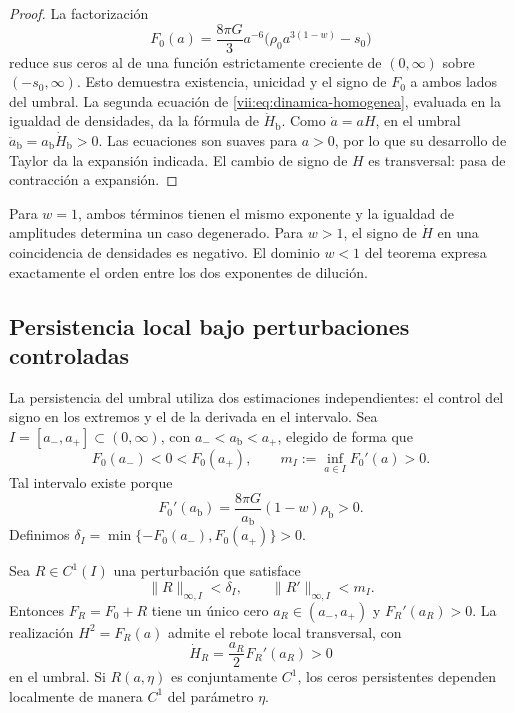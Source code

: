 \begin{proof}
La factorización
\[
 F_0(a)=\frac{8\pi G}{3}a^{-6}
             \bigl(\rho_0a^{3(1-w)}-s_0\bigr)
\]
reduce sus ceros al de una función estrictamente creciente de
\((0,\infty)\) sobre \((-s_0,\infty)\). Esto demuestra existencia,
unicidad y el signo de \(F_0\) a ambos lados del umbral.
La segunda ecuación de \eqref{vii:eq:dinamica-homogenea}, evaluada
en la igualdad de densidades, da la fórmula de \(\dot H_{\mathrm b}\).
Como \(\dot a=aH\), en el umbral
\(\ddot a_{\mathrm b}=a_{\mathrm b}\dot H_{\mathrm b}>0\).
Las ecuaciones son suaves para \(a>0\), por lo que su desarrollo de
Taylor da la expansión indicada. El cambio de signo de \(H\) es
transversal: pasa de contracción a expansión.
\end{proof}

Para \(w=1\), ambos términos tienen el mismo exponente y la igualdad de
amplitudes determina un caso degenerado. Para \(w>1\), el signo de
\(\dot H\) en una coincidencia de densidades es negativo.
El dominio \(w<1\) del teorema expresa exactamente el orden entre los
dos exponentes de dilución.

\subsection{Persistencia local bajo perturbaciones controladas}
\label{vii:sec:persistencia}

La persistencia del umbral utiliza dos estimaciones independientes:
el control del signo en los extremos y el de la derivada en el
intervalo. Sea \(I=[a_-,a_+]\subset(0,\infty)\), con
\(a_-<a_{\mathrm b}<a_+\), elegido de forma que
\[
 F_0(a_-)<0<F_0(a_+),\qquad
 m_I:=\inf_{a\in I}F_0'(a)>0.
\]
Tal intervalo existe porque
\[
 F_0'(a_{\mathrm b})
   =\frac{8\pi G}{a_{\mathrm b}}(1-w)\rho_{\mathrm b}>0.
\]
Definimos
\(\delta_I=\min\{-F_0(a_-),F_0(a_+)\}>0\).

\begin{theorem}
\label{vii:thm:persistencia}
Sea \(R\in C^1(I)\) una perturbación que satisface
\[
 \|R\|_{\infty,I}<\delta_I,\qquad
 \|R'\|_{\infty,I}<m_I.
\]
Entonces \(F_R=F_0+R\) tiene un único cero \(a_R\in(a_-,a_+)\) y
\(F_R'(a_R)>0\). La realización \(H^2=F_R(a)\) admite el rebote local
transversal, con
\[
 \dot H_R=\frac{a_R}{2}F_R'(a_R)>0
\]
en el umbral. Si \(R(a,\eta)\) es conjuntamente \(C^1\), los ceros
persistentes dependen localmente de manera \(C^1\) del parámetro \(\eta\).
\end{theorem}

